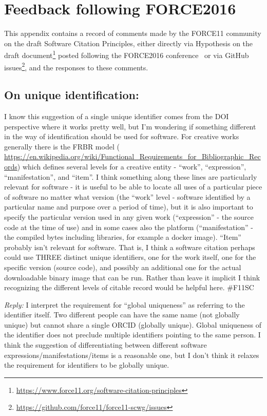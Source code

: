 \documentclass[12pt, oneside]{amsart}
\begin{document}
\section{Feedback following FORCE2016}
\label{app:force16-feedback}

This appendix contains a record of comments made by the FORCE11 community on the draft Software Citation Principles, either directly via Hypothesis on the draft document\footnote{\url{https://www.force11.org/software-citation-principles}} posted following the FORCE2016 conference~\cite{force2016} or via GitHub issues\footnote{\url{https://github.com/force11/force11-scwg/issues}}, and the responses to these comments.

\subsection{On unique identification:} I know this suggestion of a single unique identifier comes from the DOI perspective where it works pretty well, but I'm wondering if something different in the way of identification should be used for software. For creative works generally there is the FRBR model ( \url{https://en.wikipedia.org/wiki/Functional_Requirements_for_Bibliographic_Records}) which defines several levels for a creative entity - ``work'', ``expression'', ``manifestation'', and ``item''. I think something along these lines are particularly relevant for software - it is useful to be able to locate all uses of a particular piece of software no matter what version (the ``work'' level - software identified by a particular name and purpose over a period of time), but it is also important to specify the particular version used in any given work (``expression'' - the source code at the time of use) and in some cases also the platform (``manifestation'' - the compiled bytes including libraries, for example a docker image). ``Item'' probably isn't relevant for software. That is, I think a software citation perhaps could use THREE distinct unique identifiers, one for the work itself, one for the specific version (source code), and possibly an additional one for the actual downloadable binary image that can be run. Rather than leave it implicit I think recognizing the different levels of citable record would be helpful here. \#{F11SC}

\emph{Reply:} I interpret the requirement for ``global uniqueness'' as referring to the identifier itself. Two different people can have the same name (not globally unique) but cannot share a single ORCID (globally unique). Global uniqueness of the identifier does not preclude multiple identifiers pointing to the same person. I think the suggestion of differentiating between different software expressions\slash manifestations\slash items is a reasonable one, but I don't think it relaxes the requirement for identifiers to be globally unique.
\end{document}
